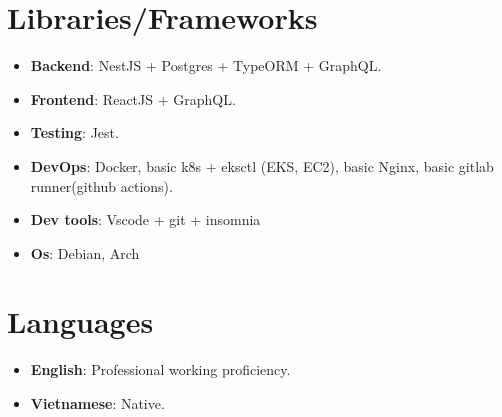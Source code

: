 \documentclass[letterpaper,11pt]{article}
\newcommand{\resumeItem}[2]{
  \item\small{
    \textbf{#1}{: #2 \vspace{-2pt}}
  }
}
\newcommand{\resumeSubItem}[2]{\resumeItem{#1}{#2}\vspace{-4pt}}
\newcommand{\resumeSubHeadingListStart}{\begin{itemize}[leftmargin=*]}
\newcommand{\resumeSubHeadingListEnd}{\end{itemize}}
\begin{document}
\section{Libraries/Frameworks}
  \resumeSubHeadingListStart
    \resumeSubItem{Backend}
      {NestJS + Postgres + TypeORM + GraphQL.}
    \resumeSubItem{Frontend}
      {ReactJS + GraphQL.}
    \resumeSubItem{Testing}
      {Jest.}
    \resumeSubItem{DevOps}
      {Docker, basic k8s + eksctl (EKS, EC2), basic Nginx, basic gitlab runner(github actions).}
    \resumeSubItem{Dev tools}
      {Vscode + git + insomnia}
    \resumeSubItem{Os}
      {Debian, Arch}
  \resumeSubHeadingListEnd


\section{Languages}
  \resumeSubHeadingListStart
    \resumeSubItem{English}
      {Professional working proficiency.}
    \resumeSubItem{Vietnamese}
      {Native.}
  \resumeSubHeadingListEnd


\end{document}
